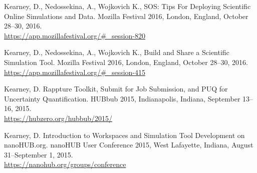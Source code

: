 \documentclass[10pt]{article}
\renewcommand\emph[1]{#1}
\begin{document}
\begin{bibenum}

    \item Kearney, D., Nedossekina, A., Wojkovich K., SOS: Tips
        For Deploying Scientific Online Simulations and Data.
        \emph{Mozilla Festival 2016},
        London, England, October 28--30, 2016. \\
        \url{https://app.mozillafestival.org/#_session-820}

    \item Kearney, D., Nedossekina, A., Wojkovich K., Build and Share
        a Scientific Simulation Tool. \emph{Mozilla Festival 2016},
        London, England, October 28--30, 2016. \\
        \url{https://app.mozillafestival.org/#_session-415}

    \item Kearney, D. Rappture Toolkit, Submit for Job Submission, and
        PUQ for Uncertainty Quantification. \emph{HUBbub 2015},
        Indianapolis, Indiana, September 13--16, 2015. \\
        \url{https://hubzero.org/hubbub/2015/}

    \item Kearney, D. Introduction to Workspaces and Simulation Tool
        Development on nanoHUB.org. \emph{nanoHUB User Conference 2015},
        West Lafayette, Indiana, August 31--September 1, 2015. \\
        \url{https://nanohub.org/groups/conference}


\end{bibenum}
\end{document}
